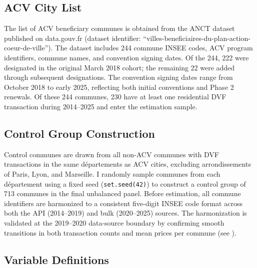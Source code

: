 \documentclass[12pt]{article}
\begin{document}
\subsection{ACV City List}

The list of ACV beneficiary communes is obtained from the ANCT dataset published on data.gouv.fr (dataset identifier: ``villes-beneficiaires-du-plan-action-coeur-de-ville''). The dataset includes 244 commune INSEE codes, ACV program identifiers, commune names, and convention signing dates. Of the 244, 222 were designated in the original March 2018 cohort; the remaining 22 were added through subsequent designations. The convention signing dates range from October 2018 to early 2025, reflecting both initial conventions and Phase 2 renewals. Of these 244 communes, 230 have at least one residential DVF transaction during 2014--2025 and enter the estimation sample.

\subsection{Control Group Construction}

Control communes are drawn from all non-ACV communes with DVF transactions in the same d\'{e}partements as ACV cities, excluding arrondissements of Paris, Lyon, and Marseille. I randomly sample communes from each d\'{e}partement using a fixed seed (\texttt{set.seed(42)}) to construct a control group of 713 communes in the final unbalanced panel. Before estimation, all commune identifiers are harmonized to a consistent five-digit INSEE code format across both the API (2014--2019) and bulk (2020--2025) sources. The harmonization is validated at the 2019--2020 data-source boundary by confirming smooth transitions in both transaction counts and mean prices per commune (see ).

\subsection{Variable Definitions}
\end{document}
